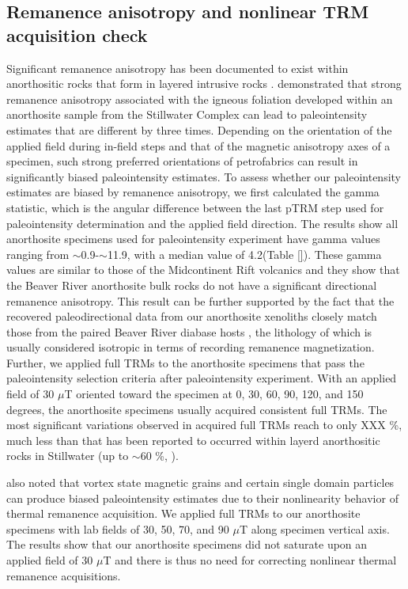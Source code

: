 \documentclass[draft]{agujournal2019}
\begin{document}
\subsection*{Remanence anisotropy and nonlinear TRM acquisition check}
Significant remanence anisotropy has been documented to exist within anorthositic rocks that form in layered intrusive rocks \cite{Selkin2000a, Feinberg2006a}. \cite{Selkin2000a} demonstrated that strong remanence anisotropy associated with the igneous foliation developed within an anorthosite sample from the Stillwater Complex can lead to paleointensity estimates that are different by three times. Depending on the orientation of the applied field during in-field steps and that of the magnetic anisotropy axes of a specimen, such strong preferred orientations of petrofabrics can result in significantly biased paleointensity estimates. To assess whether our paleointensity estimates are biased by remanence anisotropy, we first calculated the gamma statistic, which is the angular difference between the last pTRM step used for paleointensity determination and the applied field direction. The results show all anorthosite specimens used for paleointensity experiment have gamma values ranging from $\sim$0.9\textdegree-$\sim$11.9\textdegree, with a median value of 4.2\textdegree (Table \ref{}). These gamma values are similar to those of the Midcontinent Rift volcanics \cite{Sprain2018a} and they show that the Beaver River anorthosite bulk rocks do not have a significant directional remanence anisotropy. This result can be further supported by the fact that the recovered paleodirectional data from our anorthosite xenoliths closely match those from the paired Beaver River diabase hosts \cite{Zhang2021b}, the lithology of which is usually considered isotropic in terms of recording remanence magnetization. Further, we applied full TRMs to the anorthosite specimens that pass the paleointensity selection criteria after paleointensity experiment. With an applied field of 30 $\mu$T oriented toward the specimen at 0, 30, 60, 90, 120, and 150 degrees, the anorthosite specimens usually acquired consistent full TRMs. The most significant variations observed in acquired full TRMs reach to only XXX \%, much less than that has been reported to occurred within layerd anorthositic rocks in Stillwater (up to $\sim$60 \%, ). 

\cite{Selkin2007a} also noted that vortex state magnetic grains and certain single domain particles can produce biased paleointensity estimates due to their nonlinearity behavior of thermal remanence acquisition. We applied full TRMs to our anorthosite specimens with lab fields of 30, 50, 70, and 90 $\mu$T along specimen vertical axis. The results show that our anorthosite specimens did not saturate upon an applied field of 30 $\mu$T and there is thus no need for correcting nonlinear thermal remanence acquisitions.  
\end{document}
